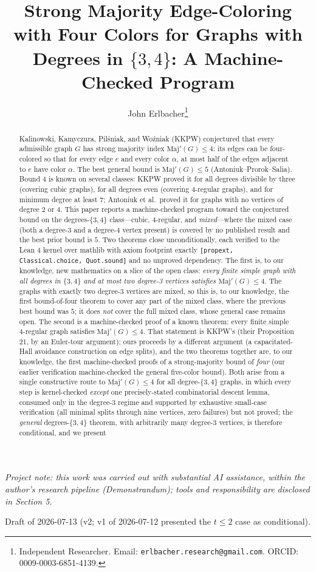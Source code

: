 \documentclass[11pt]{article}
\title{Strong Majority Edge-Coloring with Four Colors for Graphs with Degrees in \texorpdfstring{$\{3,4\}$}{\{3,4\}}: A Machine-Checked Program}
\author{John Erlbacher\thanks{Independent Researcher. Email: \texttt{erlbacher.research@gmail.com}. ORCID: 0009-0003-6851-4139.}}
\date{}
\theoremstyle{definition}
\theoremstyle{remark}
\newcommand{\Maj}{\ensuremath{\mathrm{Maj}'}}
\begin{document}
\maketitle

\begin{center}
\emph{Project note: this work was carried out with substantial AI assistance, within the author's research pipeline (Demonstrandum); tools and responsibility are disclosed in Section 5.}

\medskip
Draft of 2026-07-13 (v2; v1 of 2026-07-12 presented the $t \le 2$ case as conditional).
\end{center}

\begin{abstract}
Kalinowski, Kamyczura, Pilśniak, and Woźniak (KKPW) conjectured that every admissible graph $G$ has strong majority index $\Maj(G) \le 4$: its edges can be four-colored so that for every edge $e$ and every color $\alpha$, at most half of the edges adjacent to $e$ have color $\alpha$. The best general bound is $\Maj(G) \le 5$ (Antoniuk--Prorok--Salia). Bound $4$ is known on several classes: KKPW proved it for all degrees divisible by three (covering cubic graphs), for all degrees even (covering 4-regular graphs), and for minimum degree at least $7$; Antoniuk et al.\ proved it for graphs with no vertices of degree $2$ or $4$. This paper reports a machine-checked program toward the conjectured bound on the degrees-$\{3,4\}$ class---cubic, 4-regular, and \emph{mixed}---where the mixed case (both a degree-3 and a degree-4 vertex present) is covered by no published result and the best prior bound is $5$. Two theorems close unconditionally, each verified to the Lean 4 kernel over mathlib with axiom footprint exactly \texttt{[propext, Classical.choice, Quot.sound]} and no unproved dependency. The first is, to our knowledge, new mathematics on a slice of the open class: \emph{every finite simple graph with all degrees in $\{3,4\}$ and at most two degree-3 vertices satisfies $\Maj(G) \le 4$}. The graphs with exactly two degree-3 vertices are mixed, so this is, to our knowledge, the first bound-of-four theorem to cover any part of the mixed class, where the previous best bound was $5$; it does \emph{not} cover the full mixed class, whose general case remains open. The second is a machine-checked proof of a known theorem: every finite simple 4-regular graph satisfies $\Maj(G) \le 4$. That statement is KKPW's (their Proposition 21, by an Euler-tour argument); ours proceeds by a different argument (a capacitated-Hall avoidance construction on edge splits), and the two theorems together are, to our knowledge, the first machine-checked proofs of a strong-majority bound of \emph{four} (our earlier verification machine-checked the general five-color bound). Both arise from a single constructive route to $\Maj(G) \le 4$ for all degree-$\{3,4\}$ graphs, in which every step is kernel-checked \emph{except} one precisely-stated combinatorial descent lemma, consumed only in the degree-3 regime and supported by exhaustive small-case verification (all minimal splits through nine vertices, zero failures) but not proved; the \emph{general} degrees-$\{3,4\}$ theorem, with arbitrarily many degree-3 vertices, is therefore conditional, and we present 
\end{abstract}
\end{document}
